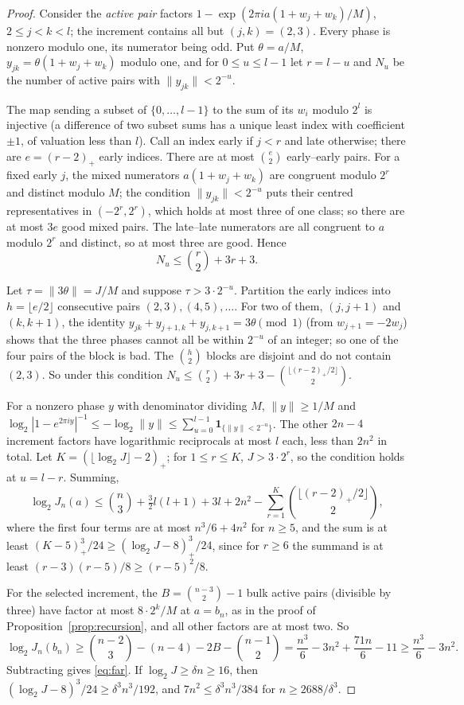 \begin{proof}
Consider the \emph{active pair} factors $1-\exp(2\pi ia(1+w_j+w_k)/M)$,
$2\le j<k<l$; the increment contains all but $(j,k)=(2,3)$. Every phase is
nonzero modulo one, its numerator being odd. Put $\theta=a/M$,
$y_{jk}=\theta(1+w_j+w_k)$ modulo one, and for $0\le u\le l-1$ let $r=l-u$ and
$N_u$ be the number of active pairs with $\|y_{jk}\|<2^{-u}$.

The map sending a subset of $\{0,\dots,l-1\}$ to the sum of its $w_i$ modulo
$2^l$ is injective (a difference of two subset sums has a unique least index
with coefficient $\pm1$, of valuation less than $l$). Call an index early if
$j<r$ and late otherwise; there are $e=(r-2)_+$ early indices. There are at
most $\binom e2$ early--early pairs. For a fixed early $j$, the mixed numerators
$a(1+w_j+w_k)$ are congruent modulo $2^r$ and distinct modulo $M$; the condition
$\|y_{jk}\|<2^{-u}$ puts their centred representatives in $(-2^r,2^r)$, which
holds at most three of one class; so there are at most $3e$ good mixed pairs.
The late--late numerators are all congruent to $a$ modulo $2^r$ and distinct,
so at most three are good. Hence
\begin{equation}\label{eq:Nu}
 N_u\le\binom r2+3r+3 .
\end{equation}

Let $\tau=\|3\theta\|=J/M$ and suppose $\tau>3\cdot2^{-u}$. Partition the early
indices into $h=\lfloor e/2\rfloor$ consecutive pairs $(2,3),(4,5),\dots$. For
two of them, $(j,j+1)$ and $(k,k+1)$, the identity
$y_{jk}+y_{j+1,k}+y_{j,k+1}=3\theta\pmod1$ (from $w_{j+1}=-2w_j$) shows that
the three phases cannot all be within $2^{-u}$ of an integer; so one of the four
pairs of the block is bad. The $\binom h2$ blocks are disjoint and do not
contain $(2,3)$. So under this condition
$N_u\le\binom r2+3r+3-\binom{\lfloor(r-2)_+/2\rfloor}2$.

For a nonzero phase $y$ with denominator dividing $M$, $\|y\|\ge1/M$ and
$\log_2|1-e^{2\pi iy}|^{-1}\le-\log_2\|y\|\le\sum_{u=0}^{l-1}
\mathbf1_{\{\|y\|<2^{-u}\}}$. The other $2n-4$ increment factors have
logarithmic reciprocals at most $l$ each, less than $2n^2$ in total. Let
$K=(\lfloor\log_2J\rfloor-2)_+$; for $1\le r\le K$, $J>3\cdot2^r$, so the
condition holds at $u=l-r$. Summing,
\[
 \log_2J_n(a)\le\binom n3+\tfrac32l(l+1)+3l+2n^2
 -\sum_{r=1}^K\binom{\lfloor(r-2)_+/2\rfloor}2 ,
\]
where the first four terms are at most $n^3/6+4n^2$ for $n\ge5$, and the sum is
at least $(K-5)_+^3/24\ge(\log_2J-8)_+^3/24$, since for $r\ge6$ the summand is
at least $(r-3)(r-5)/8\ge(r-5)^2/8$.

For the selected increment, the $B=\binom{n-3}2-1$ bulk active pairs
(divisible by three) have factor at most $8\cdot2^k/M$ at $a=b_n$, as in the
proof of Proposition~\ref{prop:recursion}, and all other factors are at most
two. So
\[
 \log_2J_n(b_n)\ge\binom{n-2}3-(n-4)-2B-\binom{n-1}2
 =\frac{n^3}6-3n^2+\frac{71n}6-11\ge\frac{n^3}6-3n^2 .
\]
Subtracting gives \eqref{eq:far}. If $\log_2J\ge\delta n\ge16$, then
$(\log_2J-8)^3/24\ge\delta^3n^3/192$, and $7n^2\le\delta^3n^3/384$ for
$n\ge2688/\delta^3$.
\end{proof}

